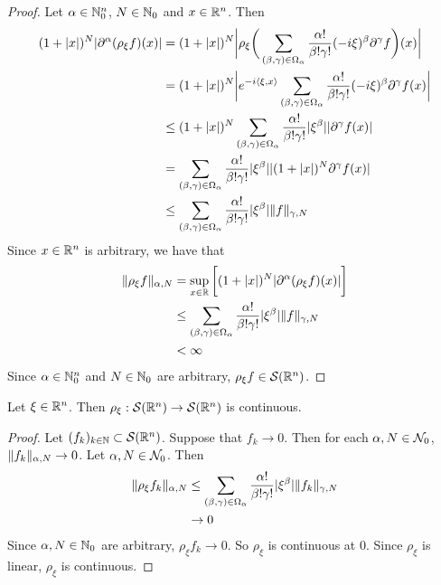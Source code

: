 \documentclass{book}
\begin{document}
	\begin{proof}
		Let $\alpha \in \mathbb{N}_0^n$, $N \in \mathbb{N}_0$ and $x \in \mathbb{R}^n$. Then  
		\begin{align*}
			(1+|x|)^N |\partial^{\alpha} (\rho_{\xi}f)(x)|
			& = (1+|x|)^N \bigg |\rho_{\xi} \bigg( \sum_{(\beta, \gamma) \in \Omega_{\alpha}} \frac{\alpha!}{\beta! \gamma!} (-i \xi)^{\beta}  \partial^{\gamma} f \bigg )(x) \bigg| \\
			& = (1+|x|)^N \bigg |e^{-i \langle \xi, x \rangle} \sum_{(\beta, \gamma) \in \Omega_{\alpha}} \frac{\alpha!}{\beta! \gamma!} (-i \xi)^{\beta}  \partial^{\gamma} f(x) \bigg| \\
			& \leq (1+|x|)^N \sum_{(\beta, \gamma) \in \Omega_{\alpha}} \frac{\alpha!}{\beta! \gamma!}  |\xi^{\beta}|  |\partial^{\gamma} f (x)| \\
			& = \sum_{(\beta, \gamma) \in \Omega_{\alpha}} \frac{\alpha!}{\beta! \gamma!}  |\xi^{\beta}|  |(1+|x|)^N \partial^{\gamma} f (x)| \\
			& \leq \sum_{(\beta, \gamma) \in \Omega_{\alpha}} \frac{\alpha!}{\beta! \gamma!}  |\xi^{\beta}| \|f\|_{\gamma, N} \\
		\end{align*}
		Since $x \in \mathbb{R}^n$ is arbitrary, we have that
		\begin{align*}
			\|\rho_{\xi} f\|_{\alpha, N}
			& = \sup_{x \in \mathbb{R}} \bigg[ (1+|x|)^N |\partial^{\alpha} (\rho_{\xi} f)(x)|\bigg] \\
			& \leq \sum_{(\beta, \gamma) \in \Omega_{\alpha}} \frac{\alpha!}{\beta! \gamma!}  |\xi^{\beta}| \|f\|_{\gamma, N} \\
			& < \infty
		\end{align*}
		Since $\alpha \in \mathbb{N}_0^n$ and $N \in \mathbb{N}_0$ are arbitrary, $\rho_{\xi} f \in \mathcal{S}(\mathbb{R}^n)$.
	\end{proof}
	
	\begin{ex}
		Let $\xi \in \mathbb{R}^n$. Then $\rho_{\xi}: \mathcal{S}(\mathbb{R}^n) \rightarrow \mathcal{S}(\mathbb{R}^n)$ is continuous.
	\end{ex}
	
	\begin{proof} 
		Let $(f_k)_{k \in \mathbb{N}} \subset \mathcal{S}(\mathbb{R}^n)$. Suppose that $f_k \rightarrow 0$. Then for each $\alpha,N \in \mathcal{N}_0$, $\|f_k\|_{\alpha, N} \rightarrow 0$. Let $\alpha,N \in \mathcal{N}_0$. Then 
		\begin{align*}
			\|\rho_{\xi}f_k\|_{\alpha, N} 
			& \leq \sum_{(\beta, \gamma) \in \Omega_{\alpha}} \frac{\alpha!}{\beta! \gamma!}  |\xi^{\beta}| \|f_k\|_{\gamma, N} \\
			& \rightarrow 0
		\end{align*}
		Since $\alpha, N \in \mathbb{N}_0$ are arbitrary, $\rho_{\xi} f_k \rightarrow 0$. So $\rho_{\xi}$  is continuous at $0$. Since $\rho_{\xi}$ is linear, $\rho_{\xi}$ is continuous.
	\end{proof}
\end{document}
